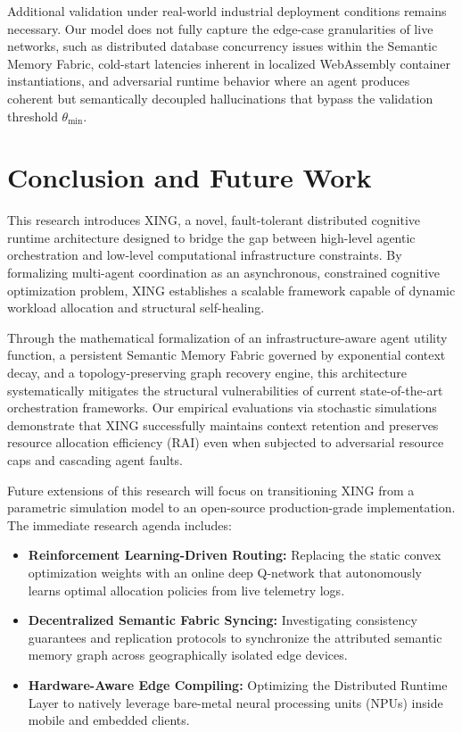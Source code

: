 \documentclass[conference]{IEEEtran}
\begin{document}
Additional validation under real-world industrial deployment conditions remains necessary. Our model does not fully capture the edge-case granularities of live networks, such as distributed database concurrency issues within the Semantic Memory Fabric, cold-start latencies inherent in localized WebAssembly container instantiations, and adversarial runtime behavior where an agent produces coherent but semantically decoupled hallucinations that bypass the validation threshold $\theta_{\min}$.

\section{Conclusion and Future Work}

This research introduces XING, a novel, fault-tolerant distributed cognitive runtime architecture designed to bridge the gap between high-level agentic orchestration and low-level computational infrastructure constraints. By formalizing multi-agent coordination as an asynchronous, constrained cognitive optimization problem, XING establishes a scalable framework capable of dynamic workload allocation and structural self-healing.

Through the mathematical formalization of an infrastructure-aware agent utility function, a persistent Semantic Memory Fabric governed by exponential context decay, and a topology-preserving graph recovery engine, this architecture systematically mitigates the structural vulnerabilities of current state-of-the-art orchestration frameworks. Our empirical evaluations via stochastic simulations demonstrate that XING successfully maintains context retention and preserves resource allocation efficiency (RAI) even when subjected to adversarial resource caps and cascading agent faults.

Future extensions of this research will focus on transitioning XING from a parametric simulation model to an open-source production-grade implementation. The immediate research agenda includes:
\begin{itemize}
    \item \textbf{Reinforcement Learning-Driven Routing:} Replacing the static convex optimization weights with an online deep Q-network that autonomously learns optimal allocation policies from live telemetry logs.
    \item \textbf{Decentralized Semantic Fabric Syncing:} Investigating consistency guarantees and replication protocols to synchronize the attributed semantic memory graph across geographically isolated edge devices.
    \item \textbf{Hardware-Aware Edge Compiling:} Optimizing the Distributed Runtime Layer to natively leverage bare-metal neural processing units (NPUs) inside mobile and embedded clients.
\end{itemize}
\end{document}
